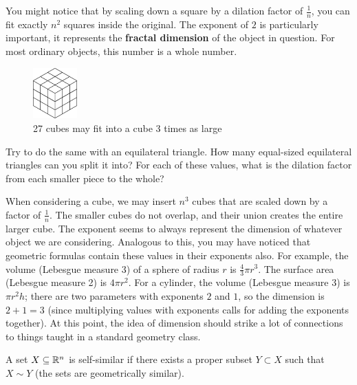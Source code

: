 You might notice that by scaling down a square by a dilation factor of $\frac{1}{n}$, you can fit exactly $n^2$ squares inside the original. The exponent of $2$ is particularly important, it represents the \textbf{fractal dimension} of the object in question. For most ordinary objects, this number is a whole number. \\

\begin{figure}
  \begin{center}
    \includegraphics[width=0.15\textwidth]{Images/1.4.2.png}
  \end{center}
  \caption{27 cubes may fit into a cube 3 times as large}
\end{figure}

\begin{exercise}
    Try to do the same with an equilateral triangle. How many equal-sized equilateral triangles can you split it into? For each of these values, what is the dilation factor from each smaller piece to the whole? 
\end{exercise}



When considering a cube, we may insert $n^3$ cubes that are scaled down by a factor of $\frac{1}{n}$. The smaller cubes do not overlap, and their union creates the entire larger cube. The exponent seems to always represent the dimension of whatever object we are considering. Analogous to this, you may have noticed that geometric formulas contain these values in their exponents also. For example, the volume (Lebesgue measure 3) of a sphere of radius $r$ is $\frac{4}{3}\pi r^3$. The surface area (Lebesgue measure 2) is $4\pi r^2$. For a cylinder, the volume (Lebesgue measure 3) is $\pi r^2 h$; there are two parameters with exponents $2$ and $1$, so the dimension is $2+1=3$ (since multiplying values with exponents calls for adding the exponents together). At this point, the idea of dimension should strike a lot of connections to things taught in a standard geometry class. 

\clearpage

\begin{definition}
    A set $X\subseteq \mathbb{R}^n$ is self-similar if there exists a proper subset $Y\subset X$ such that $X \sim Y$ (the sets are geometrically similar).
\end{definition}

